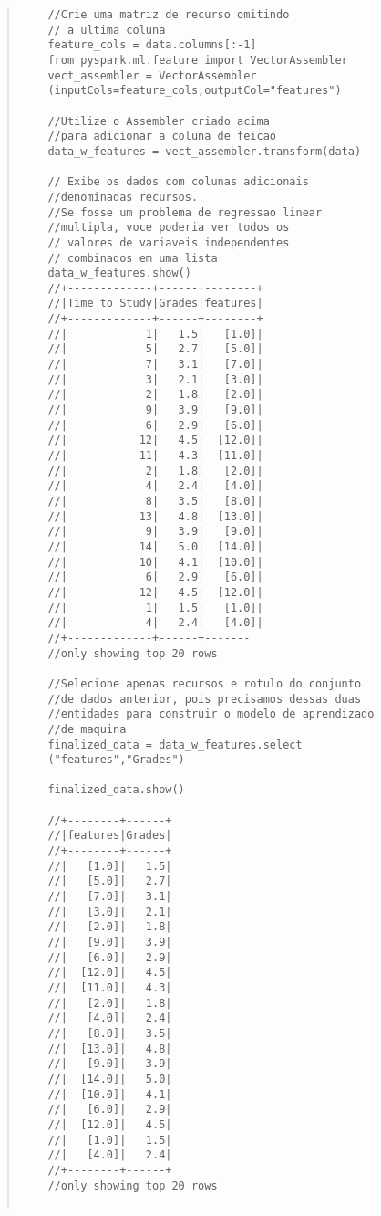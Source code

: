 \begin{quote}
\begin{lstlisting}
    //Crie uma matriz de recurso omitindo
    // a ultima coluna
    feature_cols = data.columns[:-1]
    from pyspark.ml.feature import VectorAssembler
    vect_assembler = VectorAssembler
    (inputCols=feature_cols,outputCol="features")

    //Utilize o Assembler criado acima
    //para adicionar a coluna de feicao
    data_w_features = vect_assembler.transform(data)

    // Exibe os dados com colunas adicionais
    //denominadas recursos.
    //Se fosse um problema de regressao linear
    //multipla, voce poderia ver todos os
    // valores de variaveis independentes
    // combinados em uma lista
    data_w_features.show()
    //+-------------+------+--------+
    //|Time_to_Study|Grades|features|
    //+-------------+------+--------+
    //|            1|   1.5|   [1.0]|
    //|            5|   2.7|   [5.0]|
    //|            7|   3.1|   [7.0]|
    //|            3|   2.1|   [3.0]|
    //|            2|   1.8|   [2.0]|
    //|            9|   3.9|   [9.0]|
    //|            6|   2.9|   [6.0]|
    //|           12|   4.5|  [12.0]|
    //|           11|   4.3|  [11.0]|
    //|            2|   1.8|   [2.0]|
    //|            4|   2.4|   [4.0]|
    //|            8|   3.5|   [8.0]|
    //|           13|   4.8|  [13.0]|
    //|            9|   3.9|   [9.0]|
    //|           14|   5.0|  [14.0]|
    //|           10|   4.1|  [10.0]|
    //|            6|   2.9|   [6.0]|
    //|           12|   4.5|  [12.0]|
    //|            1|   1.5|   [1.0]|
    //|            4|   2.4|   [4.0]|
    //+-------------+------+-------
    //only showing top 20 rows

    //Selecione apenas recursos e rotulo do conjunto
    //de dados anterior, pois precisamos dessas duas
    //entidades para construir o modelo de aprendizado
    //de maquina
    finalized_data = data_w_features.select
    ("features","Grades")

    finalized_data.show()

    //+--------+------+
    //|features|Grades|
    //+--------+------+
    //|   [1.0]|   1.5|
    //|   [5.0]|   2.7|
    //|   [7.0]|   3.1|
    //|   [3.0]|   2.1|
    //|   [2.0]|   1.8|
    //|   [9.0]|   3.9|
    //|   [6.0]|   2.9|
    //|  [12.0]|   4.5|
    //|  [11.0]|   4.3|
    //|   [2.0]|   1.8|
    //|   [4.0]|   2.4|
    //|   [8.0]|   3.5|
    //|  [13.0]|   4.8|
    //|   [9.0]|   3.9|
    //|  [14.0]|   5.0|
    //|  [10.0]|   4.1|
    //|   [6.0]|   2.9|
    //|  [12.0]|   4.5|
    //|   [1.0]|   1.5|
    //|   [4.0]|   2.4|
    //+--------+------+
    //only showing top 20 rows


\end{lstlisting}
\end{quote}
